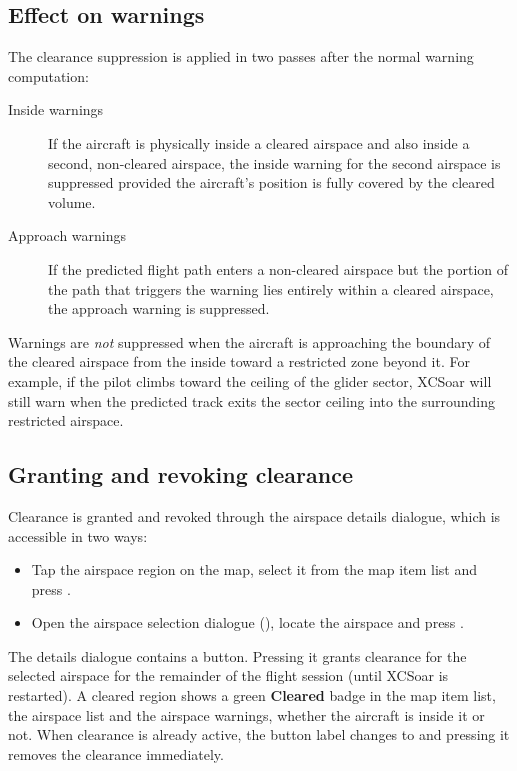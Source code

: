 \subsection*{Effect on warnings}

The clearance suppression is applied in two passes after the normal
warning computation:

\begin{description}
\item[Inside warnings] If the aircraft is physically inside a cleared
  airspace and also inside a second, non-cleared airspace, the inside
  warning for the second airspace is suppressed provided the aircraft's
  position is fully covered by the cleared volume.

\item[Approach warnings] If the predicted flight path enters a
  non-cleared airspace but the portion of the path that triggers the
  warning lies entirely within a cleared airspace, the approach warning
  is suppressed.
\end{description}

Warnings are \emph{not} suppressed when the aircraft is approaching
the boundary of the cleared airspace from the inside toward a
restricted zone beyond it.  For example, if the pilot climbs toward
the ceiling of the glider sector, XCSoar will still warn when the
predicted track exits the sector ceiling into the surrounding
restricted airspace.

\subsection*{Granting and revoking clearance}

Clearance is granted and revoked through the airspace details
dialogue, which is accessible in two ways:
\begin{itemize}
\item Tap the airspace region on the map, select it from the map item
  list and press .
\item Open the airspace selection dialogue
  (\blink{}), locate the airspace and
  press .
\end{itemize}

The details dialogue contains a  button.
Pressing it grants clearance for the selected airspace for the
remainder of the flight session (until XCSoar is restarted).  A
cleared region shows a green \textbf{Cleared} badge in the map item
list, the airspace list and the airspace warnings, whether the
aircraft is inside it or not.  When
clearance is already active, the button label changes to
 and pressing it removes the clearance
immediately.

